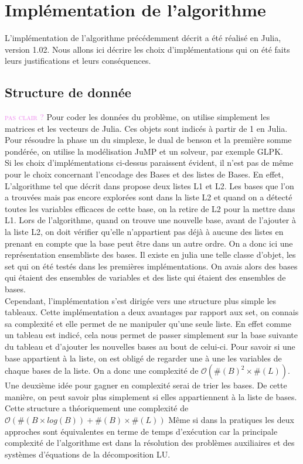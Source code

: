 \documentclass[a4paper,10pt]{article}
\newcommand{\arthur}[1]{\textcolor{violet}{\textsc{#1}}}
\theoremstyle{plain}
\begin{document}
\vfill
\break

\vfill
\break

\vfill
\break

\section{Implémentation de l'algorithme}
L'implémentation de l'algorithme précédemment décrit a été réalisé en Julia, version 1.02. Nous allons ici décrire les choix d'implémentations qui on été faits leurs justifications et leurs conséquences.

\subsection{Structure de donnée}\arthur{pas clair ?}
Pour coder les données du problème, on utilise simplement les matrices et les vecteurs de Julia. Ces objets sont indicés à partir de 1 en Julia.\\
\indent Pour résoudre la phase un du simplexe, le dual de benson et la première somme pondérée, on utilise la modélisation JuMP et un solveur, par exemple GLPK.\\
\indent Si les choix d'implémentations ci-dessus paraissent évident, il n'est pas de même pour le choix concernant l'encodage des Bases et des listes de Bases. En effet, L'algorithme tel que décrit dans \cite{ehrgott2005multicriteria} propose deux listes L1 et L2. Les bases que l'on a trouvées mais pas encore explorées sont dans la liste L2 et quand on a détecté toutes les variables efficaces de cette base, on   la retire de L2 pour la mettre dans L1. Lors de l'algorithme, quand on trouve une nouvelle base, avant de l'ajouter à la liste L2, on doit vérifier qu'elle n'appartient pas déjà à aucune des listes en prenant en compte que la base peut être dans un autre ordre. On a donc ici une représentation ensembliste des bases. Il existe en julia une telle classe d'objet, les set qui on été testés dans les premières implémentations. On avais alors des bases qui étaient des ensembles de variables et des liste qui étaient des ensembles de bases.\\
\indent Cependant, l'implémentation s'est dirigée vers une structure plus simple les tableaux. Cette implémentation a deux avantages par rapport aux set, on connais sa complexité et elle permet de ne manipuler qu'une seule liste. En effet comme un tableau est indicé, cela nous permet de passer simplement sur la base suivante du tableau et d'ajouter les nouvelles bases au bout de celui-ci. Pour savoir si une base appartient à la liste, on est obligé de regarder une à une les variables de chaque bases de la liste. On a donc une complexité de $\mathcal{O}(\#(B)^2 \times \#(L))$.\\
Une deuxième idée pour gagner en complexité serai de trier les bases. De cette manière, on peut savoir plus simplement si elles appartiennent à la liste de bases. Cette structure a théoriquement une complexité de $\mathcal{O}(\#(B\times log(B))+\#(B)\times \#(L))$ Même si dans la pratiques les deux approches sont équivalentes en terme de temps d'exécution car la principale complexité de l'algorithme est dans la résolution des problèmes auxiliaires et des systèmes d'équations de la décomposition LU.
\end{document}
